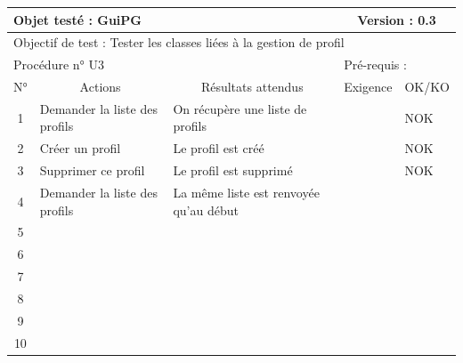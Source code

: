 \documentclass{../res/univ-projet}
\begin{document}
\begin{center}
    \begin{tabular}{|c|p{5cm}|p{5cm}|p{1.5cm}|p{1.5cm}|}
      \hline
      \multicolumn{3}{|l|}{Objet testé : GuiPG} & \multicolumn{2}{c|}{Version : 0.3}\\ \hline
      \multicolumn{5}{|l|}{Objectif de test : Tester les classes liées à la gestion de profil}\\ \hline
      \multicolumn{3}{|l|}{Procédure n° U3} & \multicolumn{2}{p{3cm}|}{Pré-requis : }\\ \hline
      \multicolumn{1}{|c|}{N°} & \multicolumn{1}{c|}{Actions} & \multicolumn{1}{c|}{Résultats attendus} & 
      \multicolumn{1}{c|}{Exigence} & \multicolumn{1}{c|}{OK/KO}\\ \hline
      1 & Demander la liste des profils & On récupère une liste de profils &  & NOK \\
      2 & Créer un profil & Le profil est créé &  & NOK \\
      3 & Supprimer ce profil & Le profil est supprimé &  & NOK \\ 
      4 & Demander la liste des profils & La même liste est renvoyée qu'au début &  & \\
      5 &  &  &  & \\
      6 &  &  &  & \\
      7 &  &  &  & \\
      8 &  &  &  & \\
      9 &  &  &  & \\
      10 &  &  &  &\\ 
  \hline
    \end{tabular}
    \vskip 2.2cm



\end{center}
\end{document}
